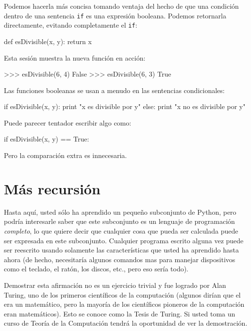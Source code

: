 Podemos hacerla más concisa tomando ventaja del hecho de que una
condición dentro de una sentencia \texttt{if} es una expresión booleana. 
Podemos retornarla directamente, evitando completamente el \texttt{if}:

\beforeverb
\begin{pythoncode}
def esDivisible(x, y):
  return x %
\end{pythoncode}
\afterverb
%

Esta sesión muestra la nueva función en acción:

\beforeverb
\begin{pyconcode}
>>>   esDivisible(6, 4)
False
>>>   esDivisible(6, 3)
True
\end{pyconcode}
\afterverb
%

Las funciones booleanas se usan a menudo en las sentencias condicionales:

\beforeverb
\begin{pythoncode}
if esDivisible(x, y):
  print "x es divisible por y"
else:
  print "x no es divisible por y"
\end{pythoncode}
\afterverb
%

Puede parecer tentador escribir algo como:

\beforeverb
\begin{pythoncode}
if esDivisible(x, y) == True:
\end{pythoncode}
\afterverb
%

Pero la comparación extra es innecesaria.



\section{Más recursión}

Hasta aquí, usted sólo ha aprendido un pequeño subconjunto de Python,
pero podría interesarle saber que este subconjunto es un lenguaje
de programación {\em completo}, lo que quiere decir que cualquier 
cosa que pueda ser calculada puede ser expresada en este subconjunto.
Cualquier programa escrito alguna vez puede ser reescrito usando solamente
las características que usted ha aprendido hasta ahora (de hecho, 
necesitaría algunos comandos mas para manejar dispositivos como
el teclado, el ratón, los discos, etc., pero eso sería todo).

Demostrar esta afirmación no es un ejercicio trivial y fue logrado por 
Alan Turing, uno de los primeros científicos de la computación (algunos
dirían que el era un matemático, pero la mayoría de los científicos
pioneros de la computación  eran matemáticos). Esto se conoce como la Tesis
de Turing. Si usted toma un curso de Teoría de la Computación tendrá
la oportunidad de ver la demostración.

